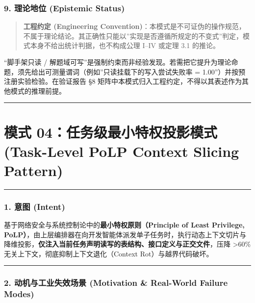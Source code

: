 \subsubsection{9. 理论地位 (Epistemic
Status)}\label{ux7406ux8bbaux5730ux4f4d-epistemic-status}

\begin{quote}
\textbf{工程约定 (Engineering
Convention)}：本模式是不可证伪的操作规范，不属于理论结论。其正确性只能以''实现是否遵循所规定的不变式''判定，模式本身不给出统计判据，也不构成公理
I--IV 或定理 3.1 的推论。
\end{quote}

``脚手架只读 /
解题域可写''是强制约束而非经验发现。若需把它提升为理论命题，须先给出可测量谓词（例如''只读挂载下的写入尝试失败率
= 1.00''）并按预注册实验检验。在验证报告 §8
矩阵中本模式归入工程约定，不得以其表述作为其他模式的推理前提。

\begin{center}\rule{0.5\linewidth}{0.5pt}\end{center}

\section{模式 04：任务级最小特权投影模式 (Task-Level PoLP Context
Slicing
Pattern)}\label{ux6a21ux5f0f-04ux4efbux52a1ux7ea7ux6700ux5c0fux7279ux6743ux6295ux5f71ux6a21ux5f0f-task-level-polp-context-slicing-pattern}

\begin{center}\rule{0.5\linewidth}{0.5pt}\end{center}

\subsubsection{1. 意图 (Intent)}\label{ux610fux56fe-intent-3}

基于网络安全与系统控制论中的\textbf{最小特权原则（Principle of Least
Privilege,
PoLP）}，由上层编排器在向开发智能体派发单子任务时，执行动态上下文切片与降维投影，\textbf{仅注入当前任务声明读写的表结构、接口定义与正交文件}，压降
\textgreater60\% 无关上下文，彻底抑制上下文退化（Context
Rot）与越界代码破坏。

\begin{center}\rule{0.5\linewidth}{0.5pt}\end{center}

\subsubsection{2. 动机与工业失效场景 (Motivation \& Real-World Failure
Modes)}\label{ux52a8ux673aux4e0eux5de5ux4e1aux5931ux6548ux573aux666f-motivation-real-world-failure-modes-3}


